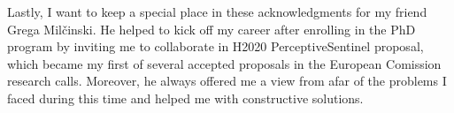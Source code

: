 Lastly, I want to keep a special place in these acknowledgments for my friend Grega Milčinski.
He helped to kick off my career after enrolling in the PhD program by inviting me to collaborate in H2020 PerceptiveSentinel proposal, which became my first of several accepted proposals in the European Comission research calls.
Moreover, he always offered me a view from afar of the problems I faced during this time and helped me with constructive solutions.


